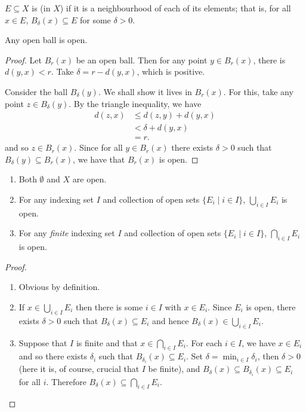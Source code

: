\begin{definition}
$E\subseteq X$ is  (in $X$) if it is a neighbourhood of each of its elements; that is, for all $x\in E$, $B_\delta(x)\subseteq E$ for some $\delta>0$.
\end{definition}

\begin{proposition}
Any open ball is open.
\end{proposition}

\begin{proof}
Let $B_r(x)$ be an open ball. Then for any point $y\in B_r(x)$, there is $d(y,x)<r$. Take $\delta=r-d(y,x)$, which is positive.

Consider the ball $B_\delta(y)$. We shall show it lives in $B_r(x)$. For this, take any point $z\in B_\delta(y)$. By the triangle inequality, we have
\begin{align*}
d(z,x)&\le d(z,y)+d(y,x)\\
&<\delta+d(y,x)\\
&=r.
\end{align*}
and so $z\in B_r(x)$. Since for all $y\in B_r(x)$ there exists $\delta>0$ such that $B_\delta(y)\subseteq B_r(x)$, we have that $B_r(x)$ is open.
\end{proof}

\begin{proposition}\label{prop:open-set-properties}
\begin{enumerate}[label=(\arabic*)]
\item Both $\emptyset$ and $X$ are open.
\item For any indexing set $I$ and collection of open sets $\{E_i\mid i\in I\}$, $\bigcup_{i\in I}E_i$ is open.
\item For any \emph{finite} indexing set $I$ and collection of open sets $\{E_i\mid i\in I\}$, $\bigcap_{i\in I}E_i$ is open.
\end{enumerate}
\end{proposition}

\begin{proof} \
\begin{enumerate}[label=(\arabic*)]
\item Obvious by definition.
\item If $ x\in\bigcup_{i\in I}E_i$ then there is some $i\in I$ with $x\in E_i$. Since $E_i$ is open, there exists $\delta>0$ such that $B_\delta(x)\subseteq E_i$ and hence $ B_\delta(x)\in\bigcup_{i\in I}E_i$.
\item Suppose that $I$ is finite and that $ x\in\bigcap_{i\in I}E_i$. For each $i\in I$, we have $x\in E_i$ and so there exists $\delta_i$ such that $B_{\delta_i}(x)\subseteq E_i$. Set $\delta=\min_{i\in I}\delta_i$, then $\delta>0$ (here it is, of course, crucial that $I$ be finite), and $B_\delta(x)\subseteq B_{\delta_i}(x)\subseteq E_i$ for all $i$. Therefore $ B_\delta(x)\subseteq\bigcap_{i\in I}E_i$.
\end{enumerate}
\end{proof}

